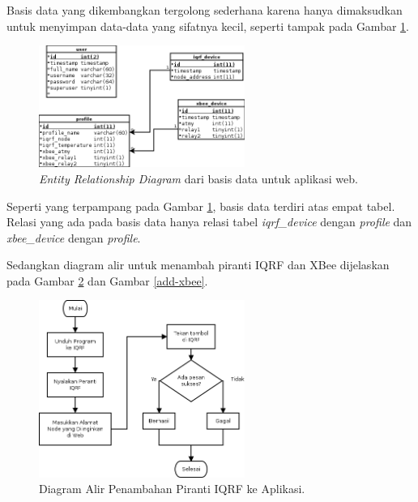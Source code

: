 			Basis data yang dikembangkan tergolong sederhana karena hanya dimaksudkan untuk menyimpan data-data yang sifatnya kecil, seperti tampak pada Gambar \ref{erd}.

			\begin{figure}[H]
			  \centering
			    \includegraphics[width=0.6\textwidth]{gambar/erd}
			    \caption{\emph{Entity Relationship Diagram} dari basis data untuk aplikasi web.}
			    \label{erd}
			\end{figure}

			Seperti yang terpampang pada Gambar \ref{erd}, basis data terdiri atas empat tabel. Relasi yang ada pada basis data hanya relasi tabel \emph{iqrf\_device} dengan \emph{profile} dan \emph{xbee\_device} dengan \emph{profile}.

			Sedangkan diagram alir untuk menambah piranti IQRF dan XBee dijelaskan pada Gambar \ref{add-iqrf} dan Gambar \ref{add-xbee}.

			\begin{figure}[H]
			  \centering
			    \includegraphics[width=0.6\textwidth]{gambar/add-iqrf}
			    \caption{Diagram Alir Penambahan Piranti IQRF ke Aplikasi.}
			    \label{add-iqrf}
			\end{figure}


